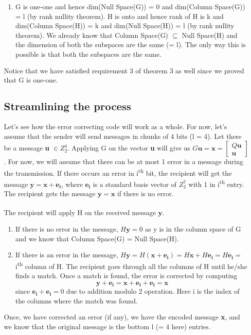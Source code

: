 \documentclass[11pt,a4paper]{article}
\begin{document}
\begin{enumerate}
\begin{enumerate}
        \item
        G is one-one and hence dim(Null Space(G)) = 0 and dim(Column Space(G)) = l (by rank nullity theorem). H is onto and hence rank of H is k and dim(Column Space(H)) = k and dim(Null Space(H)) = l (by rank nullity theorem). We already know that Column Space(G) $\subseteq$ Null Space(H) and the dimension of both the subspaces are the same (= l). The only way this is possible is that both the subspaces are the same. 
    \end{enumerate}
    
    Notice that we have satisfied requirement 3 of theorem 3 as well since we proved that G is one-one. 
    
\end{enumerate}

\subsection{Streamlining the process}
Let's see how the error correcting code will work as a whole. For now, let's assume that the sender will send messages in chunks of 4 bits (l = 4). Let there be a message \textbf{u} $\in Z_2^4$. Applying G on the vector \textbf{u} will give us
$
G\mathbf{u} = \mathbf{x} = 
\begin{bmatrix}
    Q\mathbf{u}\\
    \mathbf{u}
\end{bmatrix}
$.
For now, we will assume that there can be at most 1 error in a message during the transmission. If there occurs an error in i\textsuperscript{th} bit, the recipient will get the message $\mathbf{y} = \mathbf{x} + \mathbf{e_i}$, where $\mathbf{e_i}$ is a standard basis vector of $Z_2^7$ with 1 in i\textsuperscript{th} entry. The recipient gets the message $\mathbf{y} = \mathbf{x}$ if there is no error. 

\paragraph{}
The recipient will apply H on the received message $\mathbf{y}$. 
\begin{enumerate}
    \item If there is no error in the message, $H\mathbf{y} = 0$ as y is in the column space of G and we know that Column Space(G) = Null Space(H). 
    
    \item If there is an error in the message, $H\mathbf{y} = H(\mathbf{x} + \mathbf{e_i}) = H\mathbf{x} + H\mathbf{e_i} = H\mathbf{e_i} = $ i\textsuperscript{th} column of H. The recipient goes through all the columns of H until he/she finds a match. Once a match is found, the error is corrected by computing 
    $$
    \mathbf{y} + \mathbf{e_i} = \mathbf{x} + \mathbf{e_i} + \mathbf{e_i} = \mathbf{x}
    $$
    since $\mathbf{e_i} + \mathbf{e_i} = 0$ due to addition modulo 2 operation. Here i is the index of the columns where the match was found. 
\end{enumerate}
Once, we have corrected an error (if any), we have the encoded message \textbf{x}, and we know that the original message is the bottom l (= 4 here) entries.
\end{document}
